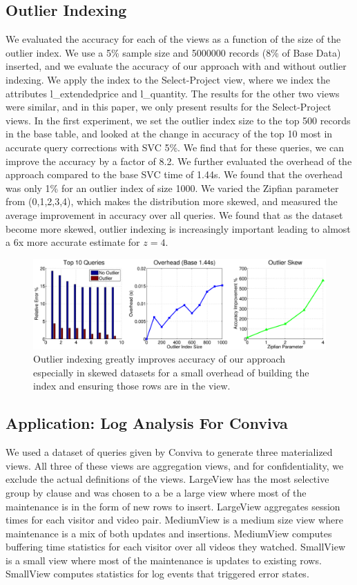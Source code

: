 \subsection{Outlier Indexing}
We evaluated the accuracy for each of the views as a function of the size of the outlier index. 
We use a 5\% sample size and 5000000 records (8\% of Base Data) inserted, and we evaluate the accuracy of our approach with and without outlier indexing.
We apply the index to the Select-Project view, where we index the attributes l\_extendedprice and l\_quantity.
The results for the other two views were similar, and in this paper, we only present results for the Select-Project views.
In the first experiment, we set the outlier index size to the top 500 records in the base table, and looked at the change in accuracy of the top 10 most in accurate query corrections with SVC 5\%.
We find that for these queries, we can improve the accuracy by a factor of  8.2.
We further evaluated the overhead of the approach compared to the base SVC time of 1.44s. 
We found that the overhead was only 1\% for an outlier index of size 1000.
We varied the Zipfian parameter from (0,1,2,3,4), which makes the distribution more skewed, and measured the average improvement in accuracy over all queries.
We found that as the dataset become more skewed, outlier indexing is increasingly important leading to almost a 6x more accurate estimate for $z=4$.

\begin{figure}[ht!]
\hspace{-2.8em}
\includegraphics[scale=0.22]{exp/exp6-outlier-full.eps}
 \caption{Outlier indexing greatly improves accuracy of our approach especially in skewed datasets for a small overhead of building the index and ensuring those rows are in the view.\label{exp7outlier}}
\end{figure}

\subsection{Application: Log Analysis For Conviva}
We used a dataset of queries given by Conviva to generate three materialized views.
All three of these views are aggregation views, and for confidentiality, we exclude the actual definitions of the views.
LargeView has the most selective group by clause and was chosen to a be a large view where most of the maintenance is in the form of new rows to insert.
LargeView aggregates session times for each visitor and video pair.
MediumView is a medium size view where maintenance is a mix of both updates and insertions.
MediumView computes buffering time statistics for each visitor over all videos they watched.
SmallView is a small view where most of the maintenance is updates to existing rows.
SmallView computes statistics for log events that triggered error states.

